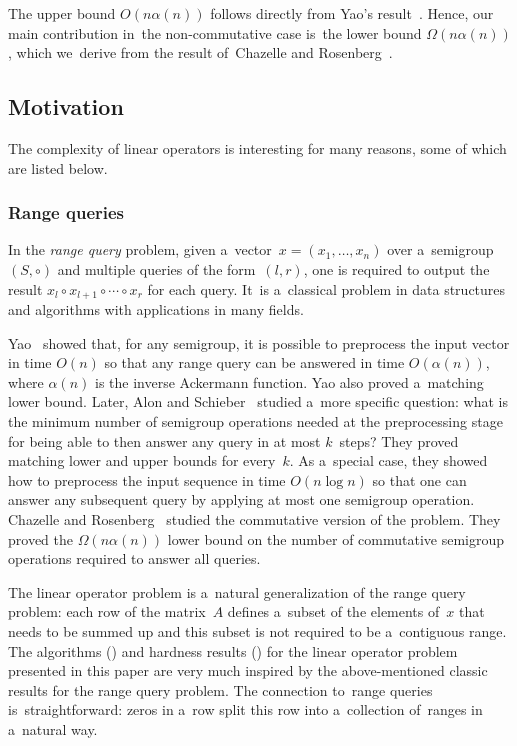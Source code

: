 \documentclass{toc}
\begin{document}
The upper bound $O(n\alpha(n))$ follows directly
from Yao's result~\cite{DBLP:conf/stoc/Yao82}.
Hence, our main contribution in~the non-commutative case
is~the lower bound $\Omega(n\alpha(n))$,
which we~derive from the result
of~Chazelle and Rosenberg~\cite{DBLP:journals/ijcga/ChazelleR91}.

\subsection{Motivation}
The complexity of linear operators is interesting for many reasons, some of
which are listed below.

%
%
%
\subsubsection{Range queries}  In the
%
%
\emph{range query} problem,
%
%
%
%
%
 given a~vector~$x=(x_1, \dotsc, x_n)$ over a~semigroup $(S, \circ)$ and
multiple queries of the form~$(l,r)$, one is required to
output the result $x_l \circ x_{l+1} \circ \dotsb \circ x_r$
for each query. It~is a~classical problem in data structures and
algorithms with applications in many fields.

Yao~\cite{DBLP:conf/stoc/Yao82} showed that, for any semigroup, it is possible
to preprocess the input vector in time $O(n)$ so that
%
%
%
any range query can be answered %
in time $O(\alpha(n))$, where $\alpha(n)$ is the inverse Ackermann
%
function.  Yao also  %
proved a~matching lower bound.
%
Later, Alon and
Schieber~\cite{Alon87optimalpreprocessing} studied a~more specific question:
what is the minimum number of semigroup operations needed at the preprocessing
stage for being able to then answer any query in at most $k$~steps? They proved
matching lower and upper bounds for every~$k$. As a~special case, they showed
how to preprocess the input sequence in time $O(n\log n)$
%
so that one can %
answer any
subsequent query by applying at most one semigroup operation.
Chazelle and Rosenberg~\cite{DBLP:journals/ijcga/ChazelleR91} studied the
commutative version of the problem. They proved the $\Omega(n \alpha(n))$ lower
bound on the number of commutative semigroup operations required to answer all
queries.

The linear operator problem is a~natural generalization of the
%
%
range query problem:
each row of the matrix~$A$ defines a~subset of the elements of~$x$
that needs to be summed up and this subset is not required to be
a~contiguous range. The algorithms () and hardness
results () for the linear operator problem presented
in this paper are very much inspired by the above-mentioned classic results for
%
%
the range query problem.
The connection to~range queries is~straightforward:
zeros in a~row split this row into a~collection of~ranges in a~natural way.
\end{document}
